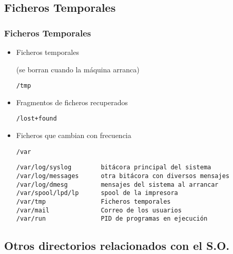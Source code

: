 \documentclass[ucs]{beamer}
\begin{document}
\subsection{Ficheros Temporales}

\begin{frame}[fragile]

\frametitle{Ficheros Temporales}
\begin{itemize}

\item 
Ficheros temporales 

(se borran cuando la máquina arranca)

\verb|/tmp|
\item
Fragmentos de ficheros recuperados

\verb|/lost+found|
\end{itemize}
\end{frame}



\begin{frame}[fragile]
\begin{itemize}

\item
Ficheros que cambian con frecuencia

\verb|/var|

  \begin{footnotesize}
  \begin{verbatim}
/var/log/syslog        bitácora principal del sistema  
/var/log/messages      otra bitácora con diversos mensajes
/var/log/dmesg         mensajes del sistema al arrancar
/var/spool/lpd/lp      spool de la impresora
/var/tmp               Ficheros temporales
/var/mail              Correo de los usuarios
/var/run               PID de programas en ejecución
  \end{verbatim}
  \end{footnotesize}

\end{itemize}
\end{frame}

\subsection{Otros directorios relacionados con el S.O.}
\end{document}
